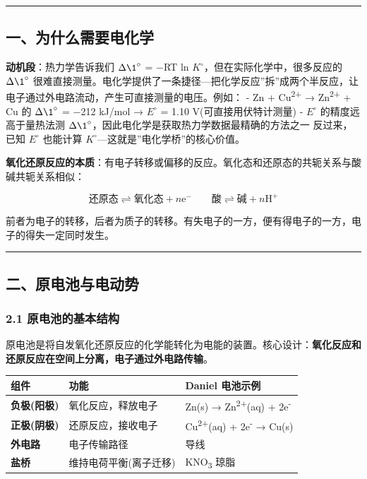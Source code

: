 \documentclass[a4paper,11pt]{ctexart}
\newcounter{none}
\begin{document}
\begin{center}\rule{0.5\linewidth}{0.5pt}\end{center}

\subsection{一、为什么需要电化学}\label{ux4e00ux4e3aux4ec0ux4e48ux9700ux8981ux7535ux5316ux5b66}

\textbf{动机段}：热力学告诉我们 \(\Delta \1^{\circ}\) = −RT ln \(K^{\circ}\)，但在实际化学中，很多反应的 \(\Delta \1^{\circ}\) 很难直接测量。电化学提供了一条捷径---把化学反应''拆''成两个半反应，让电子通过外电路流动，产生可直接测量的电压。例如：
- Zn + Cu\textsuperscript{2+} → Zn\textsuperscript{2+} + Cu 的 \(\Delta \1^{\circ}\) = −212 kJ/mol → \(E^{\circ}\) = 1.10 V(可直接用伏特计测量)
- \(E^{\circ}\) 的精度远高于量热法测 \(\Delta \1^{\circ}\)，因此电化学是获取热力学数据最精确的方法之一
反过来，已知 \(E^{\circ}\) 也能计算 \(K^{\circ}\)---这就是''电化学桥''的核心价值。

\textbf{氧化还原反应的本质}：有电子转移或偏移的反应。氧化态和还原态的共轭关系与酸碱共轭关系相似：

\[
\text{还原态} \rightleftharpoons \text{氧化态} + n\mathrm{e}^- \qquad \text{酸} \rightleftharpoons \text{碱} + n\mathrm{H}^+
\]

前者为电子的转移，后者为质子的转移。有失电子的一方，便有得电子的一方，电子的得失一定同时发生。

\begin{center}\rule{0.5\linewidth}{0.5pt}\end{center}

\subsection{二、原电池与电动势}\label{ux4e8cux539fux7535ux6c60ux4e0eux7535ux52a8ux52bf}

\subsubsection{2.1 原电池的基本结构}\label{ux539fux7535ux6c60ux7684ux57faux672cux7ed3ux6784}

原电池是将自发氧化还原反应的化学能转化为电能的装置。核心设计：\textbf{氧化反应和还原反应在空间上分离，电子通过外电路传输}。

{\def\LTcaptype{none} %
\begin{longtable}[]{@{}lll@{}}
\toprule\noalign{}
组件 & 功能 & Daniel 电池示例 \\
\midrule\noalign{}
\endhead
\bottomrule\noalign{}
\endlastfoot
\textbf{负极(阳极)} & 氧化反应，释放电子 & Zn(s) → Zn\textsuperscript{2+}(aq) + 2e\textsuperscript{-} \\
\textbf{正极(阴极)} & 还原反应，接收电子 & Cu\textsuperscript{2+}(aq) + 2e\textsuperscript{-} → Cu(s) \\
\textbf{外电路} & 电子传输路径 & 导线 \\
\textbf{盐桥} & 维持电荷平衡(离子迁移) & KNO\textsubscript{3} 琼脂 \\
\end{longtable}
}
\end{document}
